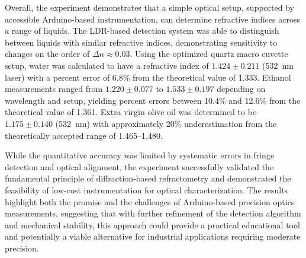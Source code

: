 Overall, the experiment demonstrates that a simple optical setup,
supported by accessible Arduino-based instrumentation, can determine
refractive indices across a range of liquids.
The LDR-based detection system was able to distinguish between liquids
with similar refractive indices, demonstrating sensitivity to changes
on the order of $\Delta n \approx 0.03$.
Using the optimized quartz macro cuvette setup, water was calculated to
have a refractive index of $1.424 \pm 0.211$ (532~nm laser) with a
percent error of 6.8\% from the theoretical value of 1.333.
Ethanol measurements ranged from $1.220 \pm 0.077$ to
$1.533 \pm 0.197$ depending on wavelength and setup, yielding percent
errors between 10.4\% and 12.6\% from the theoretical value of 1.361.
Extra virgin olive oil was determined to be $1.175 \pm 0.140$ (532~nm)
with approximately 20\% underestimation from the theoretically accepted
range of 1.465--1.480.

While the quantitative accuracy was limited by systematic errors in
fringe detection and optical alignment, the experiment successfully
validated the fundamental principle of diffraction-based refractometry
and demonstrated the feasibility of low-cost instrumentation for
optical characterization.
The results highlight both the promise and the challenges of
Arduino-based precision optics measurements, suggesting that with
further refinement of the detection algorithm and mechanical stability,
this approach could provide a practical educational tool and
potentially a viable alternative for industrial applications requiring
moderate precision.

